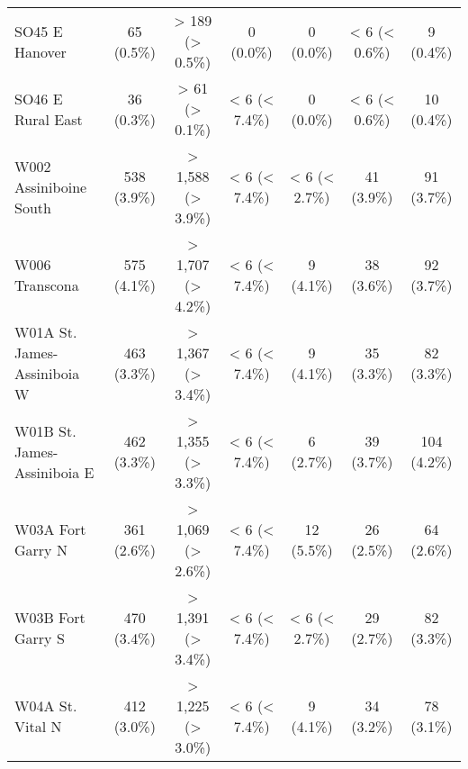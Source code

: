 \documentclass{article}
\begin{document}
\begin{table}[htbp]
\begin{longtable}{l*{6}{c}}
  SO45 E Hanover                                        &            65 (0.5\%)           &         > 189 (> 0.5\%)         &            0 (0.0\%)            &            0 (0.0\%)            &          < 6 (< 0.6\%)          &            9 (0.4\%)            \\
  SO46 E Rural East                                     &            36 (0.3\%)           &          > 61 (> 0.1\%)         &          < 6 (< 7.4\%)          &            0 (0.0\%)            &          < 6 (< 0.6\%)          &            10 (0.4\%)           \\
  W002 Assiniboine South                                &           538 (3.9\%)           &        > 1,588 (> 3.9\%)        &          < 6 (< 7.4\%)          &          < 6 (< 2.7\%)          &            41 (3.9\%)           &            91 (3.7\%)           \\
  W006 Transcona                                        &           575 (4.1\%)           &        > 1,707 (> 4.2\%)        &          < 6 (< 7.4\%)          &            9 (4.1\%)            &            38 (3.6\%)           &            92 (3.7\%)           \\
  W01A St. James-Assiniboia W                           &           463 (3.3\%)           &        > 1,367 (> 3.4\%)        &          < 6 (< 7.4\%)          &            9 (4.1\%)            &            35 (3.3\%)           &            82 (3.3\%)           \\
  W01B St. James-Assiniboia E                           &           462 (3.3\%)           &        > 1,355 (> 3.3\%)        &          < 6 (< 7.4\%)          &            6 (2.7\%)            &            39 (3.7\%)           &           104 (4.2\%)           \\
  W03A Fort Garry N                                     &           361 (2.6\%)           &        > 1,069 (> 2.6\%)        &          < 6 (< 7.4\%)          &            12 (5.5\%)           &            26 (2.5\%)           &            64 (2.6\%)           \\
  W03B Fort Garry S                                     &           470 (3.4\%)           &        > 1,391 (> 3.4\%)        &          < 6 (< 7.4\%)          &          < 6 (< 2.7\%)          &            29 (2.7\%)           &            82 (3.3\%)           \\
  W04A St. Vital N                                      &           412 (3.0\%)           &        > 1,225 (> 3.0\%)        &          < 6 (< 7.4\%)          &            9 (4.1\%)            &            34 (3.2\%)           &            78 (3.1\%)           \\

\end{longtable}
\end{table}
\end{document}
